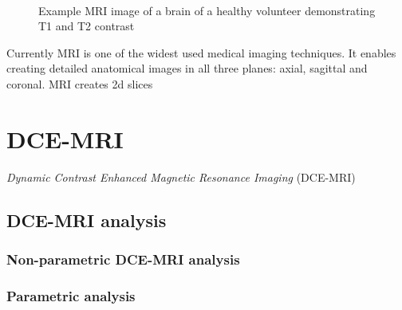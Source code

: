\begin{figure}
\captionsetup[subfloat]{captionskip=0.5cm}
	\centering
	\hspace{1.5cm}
	\\	
\vspace{0.5cm}
\caption[lol]{Example MRI image of a brain of a healthy volunteer demonstrating T1 and T2 contrast}
\label{fig:t1t2}
\end{figure}

Currently MRI is one of the widest used medical imaging techniques. It enables creating detailed anatomical images in all three planes: axial, sagittal and coronal. MRI creates 2d slices  

\section{DCE-MRI}
\textit{Dynamic Contrast Enhanced Magnetic Resonance Imaging} (DCE-MRI) 

\subsection{DCE-MRI analysis}

\subsubsection{Non-parametric DCE-MRI analysis}


\subsubsection{Parametric analysis}
